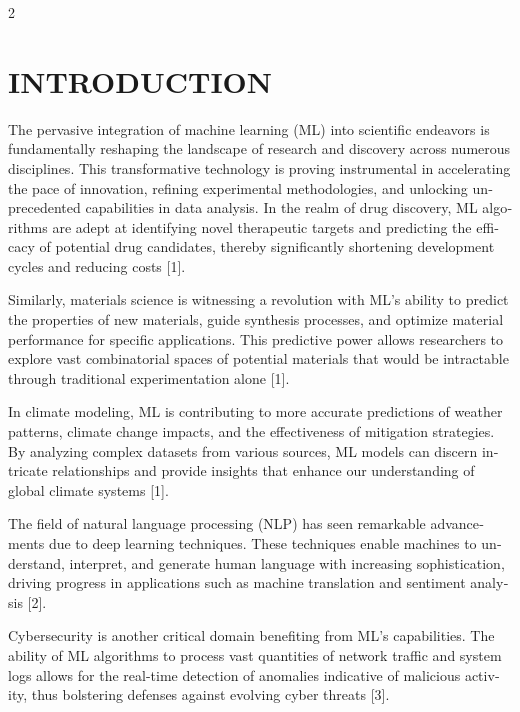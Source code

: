 \documentclass[a4paper,10pt,twoside]{article}
\newcommand{\contentfont}{\fontsize{10}{13}\calibrifont\selectfont}
\begin{document}
\contentfont
\setlength{\columnsep}{0.7cm}
\setlength{\parindent}{0pt}
\setlength{\parskip}{0.5em}
\begin{multicols}{2}

    \section*{INTRODUCTION}
    \begin{otherlanguage}{english}
    The pervasive integration of machine learning (ML) into scientific endeavors is fundamentally reshaping the landscape of research and discovery across numerous disciplines. This transformative technology is proving instrumental in accelerating the pace of innovation, refining experimental methodologies, and unlocking unprecedented capabilities in data analysis. In the realm of drug discovery, ML algorithms are adept at identifying novel therapeutic targets and predicting the efficacy of potential drug candidates, thereby significantly shortening development cycles and reducing costs [1].

Similarly, materials science is witnessing a revolution with ML's ability to predict the properties of new materials, guide synthesis processes, and optimize material performance for specific applications. This predictive power allows researchers to explore vast combinatorial spaces of potential materials that would be intractable through traditional experimentation alone [1].

In climate modeling, ML is contributing to more accurate predictions of weather patterns, climate change impacts, and the effectiveness of mitigation strategies. By analyzing complex datasets from various sources, ML models can discern intricate relationships and provide insights that enhance our understanding of global climate systems [1].

The field of natural language processing (NLP) has seen remarkable advancements due to deep learning techniques. These techniques enable machines to understand, interpret, and generate human language with increasing sophistication, driving progress in applications such as machine translation and sentiment analysis [2].

Cybersecurity is another critical domain benefiting from ML's capabilities. The ability of ML algorithms to process vast quantities of network traffic and system logs allows for the real-time detection of anomalies indicative of malicious activity, thus bolstering defenses against evolving cyber threats [3].


\end{otherlanguage}
\end{multicols}
\end{document}
